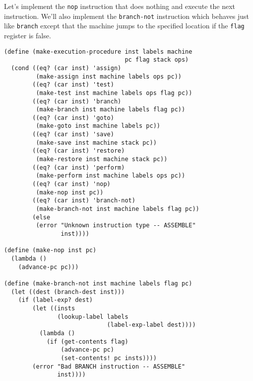 \documentclass[a4paper,12pt]{article}
\begin{document}
Let's implement the \lstinline!nop! instruction that does nothing and
execute the next instruction.  We'll also implement the
\lstinline!branch-not! instruction which behaves just like
\lstinline!branch! except that the machine jumps to the specified
location if the \lstinline!flag! register is false.

\begin{lstlisting}
(define (make-execution-procedure inst labels machine
                                  pc flag stack ops)
  (cond ((eq? (car inst) 'assign)
         (make-assign inst machine labels ops pc))
        ((eq? (car inst) 'test)
         (make-test inst machine labels ops flag pc))
        ((eq? (car inst) 'branch)
         (make-branch inst machine labels flag pc))
        ((eq? (car inst) 'goto)
         (make-goto inst machine labels pc))
        ((eq? (car inst) 'save)
         (make-save inst machine stack pc))
        ((eq? (car inst) 'restore)
         (make-restore inst machine stack pc))
        ((eq? (car inst) 'perform)
         (make-perform inst machine labels ops pc))
        ((eq? (car inst) 'nop)
         (make-nop inst pc))
        ((eq? (car inst) 'branch-not)
         (make-branch-not inst machine labels flag pc))
        (else
         (error "Unknown instruction type -- ASSEMBLE"
                inst))))

(define (make-nop inst pc)
  (lambda ()
    (advance-pc pc)))

(define (make-branch-not inst machine labels flag pc)
  (let ((dest (branch-dest inst)))
    (if (label-exp? dest)
        (let ((insts
               (lookup-label labels
                             (label-exp-label dest))))
          (lambda ()
            (if (get-contents flag)
                (advance-pc pc)
                (set-contents! pc insts))))
        (error "Bad BRANCH instruction -- ASSEMBLE"
               inst))))
\end{lstlisting}
\end{document}
